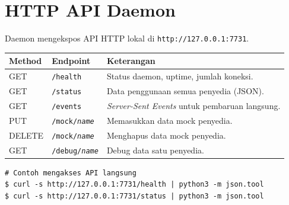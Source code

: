 \section{HTTP API Daemon}

Daemon mengekspos API HTTP lokal di \texttt{http://127.0.0.1:7731}.

\begin{longtable}{llp{7cm}}
\toprule
\textbf{Method} & \textbf{Endpoint} & \textbf{Keterangan} \\
\midrule
\endhead
GET & \texttt{/health} & Status daemon, uptime, jumlah koneksi. \\[4pt]
GET & \texttt{/status} & Data penggunaan semua penyedia (JSON). \\[4pt]
GET & \texttt{/events} & \textit{Server-Sent Events} untuk pembaruan langsung. \\[4pt]
PUT & \texttt{/mock/\textit{name}} & Memasukkan data mock penyedia. \\[4pt]
DELETE & \texttt{/mock/\textit{name}} & Menghapus data mock penyedia. \\[4pt]
GET & \texttt{/debug/\textit{name}} & Debug data satu penyedia. \\
\bottomrule
\end{longtable}

\begin{lstlisting}[style=terminal]
# Contoh mengakses API langsung
$ curl -s http://127.0.0.1:7731/health | python3 -m json.tool
$ curl -s http://127.0.0.1:7731/status | python3 -m json.tool
\end{lstlisting}
